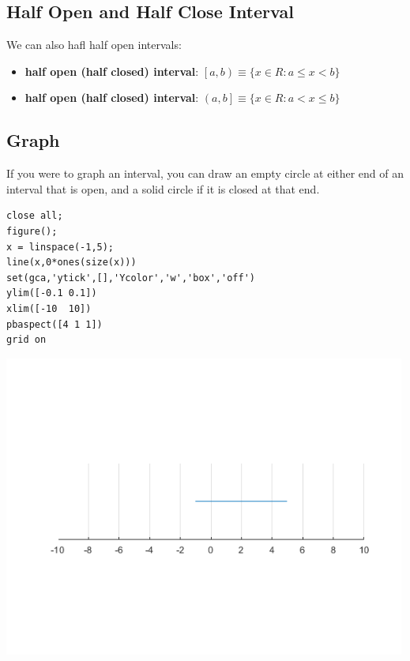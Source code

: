 \documentclass[
]{book}
\begin{document}
\hypertarget{half-open-and-half-close-interval}{%
\subsection{Half Open and Half Close Interval}\label{half-open-and-half-close-interval}}

We can also hafl half open intervals:

\begin{itemize}
\item
  \textbf{half open (half closed) interval}:
  \(\left\lbrack a,b\right)\equiv \lbrace x\in R:a\le x<b\rbrace\)
\item
  \textbf{half open (half closed) interval}:
  \(\left(a,b\right\rbrack \equiv \lbrace x\in R:a<x\le b\rbrace\)
\end{itemize}

\hypertarget{graph}{%
\subsection{Graph}\label{graph}}

If you were to graph an interval, you can draw an empty circle at either
end of an interval that is open, and a solid circle if it is closed at
that end.

\begin{verbatim}
close all;
figure();
x = linspace(-1,5);
line(x,0*ones(size(x)))
set(gca,'ytick',[],'Ycolor','w','box','off')
ylim([-0.1 0.1])
xlim([-10  10])
pbaspect([4 1 1])
grid on
\end{verbatim}

\includegraphics[width=5.20833in,height=\textheight]{img/interval_images/figure_0.png}
\end{document}

